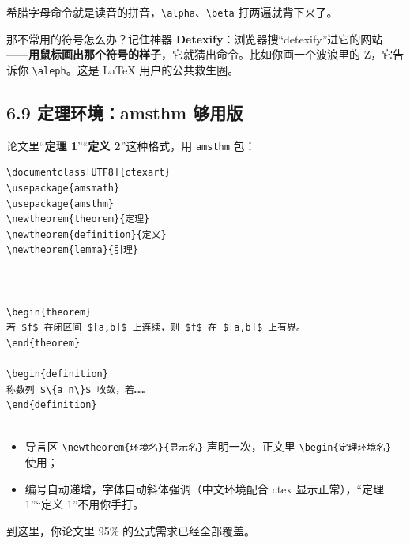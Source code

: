 希腊字母命令就是读音的拼音，\texttt{\textbackslash{}alpha}、\texttt{\textbackslash{}beta} 打两遍就背下来了。

那不常用的符号怎么办？记住神器 \textbf{Detexify}：浏览器搜“detexify”进它的网站——\textbf{用鼠标画出那个符号的样子}，它就猜出命令。比如你画一个波浪里的 Z，它告诉你 \texttt{\textbackslash{}aleph}。这是 LaTeX 用户的公共救生圈。

\subsection*{6.9 定理环境：amsthm 够用版}

论文里“\textbf{定理 1}”“\textbf{定义 2}”这种格式，用 \texttt{amsthm} 包：

\begin{lstlisting}
\documentclass[UTF8]{ctexart}
\usepackage{amsmath}
\usepackage{amsthm}
\newtheorem{theorem}{定理}
\newtheorem{definition}{定义}
\newtheorem{lemma}{引理}



\begin{theorem}
若 $f$ 在闭区间 $[a,b]$ 上连续，则 $f$ 在 $[a,b]$ 上有界。
\end{theorem}

\begin{definition}
称数列 $\{a_n\}$ 收敛，若……
\end{definition}


\end{lstlisting}

\begin{itemize}
\setlength{\itemsep}{2pt}
\item 导言区 \texttt{\textbackslash{}newtheorem\{环境名\}\{显示名\}} 声明一次，正文里 \texttt{\textbackslash{}begin\{定理环境名\}} 使用；
\item 编号自动递增，字体自动斜体强调（中文环境配合 ctex 显示正常），“定理 1”“定义 1”不用你手打。
\end{itemize}

到这里，你论文里 95\% 的公式需求已经全部覆盖。


